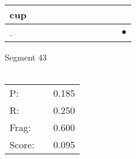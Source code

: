 \documentclass[landscape]{article}
\newcommand{\ssp}{\hspace{2pt}}
\newcommand{\mex}{\cellcolor{g}$\bullet$}
\begin{document}
\begin{tabular}{|l|p{10pt}|p{10pt}|p{10pt}|p{10pt}|p{10pt}|p{10pt}|p{10pt}|p{10pt}|p{10pt}|p{10pt}|}
\hline
\ssp cup \ssp&\hspace{2pt}&\hspace{2pt}&\hspace{2pt}&\hspace{2pt}&\hspace{2pt}&\hspace{2pt}&\hspace{2pt}&\hspace{2pt}&\hspace{2pt}&\hspace{2pt}\\
\hline
\ssp \cellcolor{ref9}. \ssp&\hspace{2pt}&\hspace{2pt}&\hspace{2pt}&\hspace{2pt}&\hspace{2pt}&\hspace{2pt}&\hspace{2pt}&\hspace{2pt}&\hspace{2pt}&\hspace{2pt}\mex\\
\hline
\end{tabular}

\vspace{6pt}
\noindent Segment 43\\\\
\noindent\begin{tabular}{lm{12pt}r}
\hline
P:&&0.185\\
R:&&0.250\\
Frag:&&0.600\\
Score:&&0.095\\
\end{tabular}

\newpage
\end{document}
